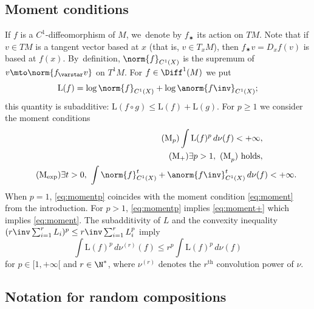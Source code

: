 \subsection{Moment conditions}\label{subs:moment}
If $f$ is a $C^1$-diffeomorphism of $M$, we~denote by $f_\varstar $ its action on $TM$. Note that
if $v\in TM$ is a tangent vector based at $x$ (that is, $v\in T_xM$), then
$f_\varstar v = D_xf(v)$ is based at $f(x)$. By~definition, $\norm{f}_{C^1(X)}$ is the supremum of
$v\mto \norm{f_\varstar v}$ on $T^1M$.
For $f\in \Diff^1(M)$ we put
\begin{equation}\label{eq:subadditive_function_L}
\mathrm L(f) = \log\norm{f}_{C^1(X)}+ \log\anorm{f\inv}_{C^1(X)};
\end{equation}
this quantity is subadditive: $\mathrm L(f\circ g)\leq \mathrm L(f)+\mathrm L(g)$.
For $p\geq 1$ we consider the moment conditions
\begin{align}\label{eq:momentp}
\tag{M$_p$}
\int \mathrm L(f)^p \, d\nu (f) < + \infty, \quad \quad \quad \quad\\
\label{eq:moment+}
\tag{M$_+$}
\exists p>1, \ \mathrm{(M}_p\mathrm{)} \text{ holds}, \quad \quad \quad\quad \\
\label{eq:momentexp}
\tag{M$_{\exp}$}
\exists t>0, \ \int \norm{f}^t_{C^1(X)}+ \anorm{f\inv}^t_{C^1(X)} \, d\nu (f) < + \infty.
\end{align}
When $p=1$, \eqref{eq:momentp} coincides with the moment condition \eqref{eq:moment} from the introduction. For $p>1$, \eqref{eq:momentp}
implies \eqref{eq:moment+} which implies \eqref{eq:moment}.
The subadditivity of $L$ and the convexity inequality
$(r\inv \sum_{i=1}^r L_i)^p\leq r\inv \sum_{i=1}^r L_i^p$ imply
\begin{equation}\label{eq:Mp_iteree}
\int \mathrm L(f)^p \, d\nu^{(r)} (f) \leq r^{p} \int \mathrm L(f)^p \, d\nu (f)
\end{equation}
for $p\in [1,+\infty[$ and $r\in \N^*$, where $\nu^{(r)}$ denotes the $r^\mathrm{th}$ convolution power of $\nu$.

\subsection{Notation for random compositions} \label{subs:notation}

